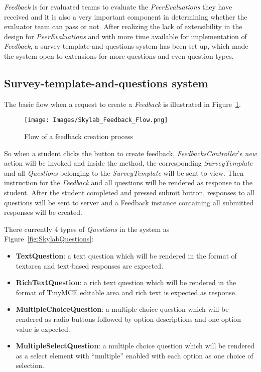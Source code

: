 \textit{Feedback} is for evaluated teams to evaluate the \textit{PeerEvaluations} they have received and it is also a very important component in determining whether the evaluator team can pass or not. After realizing the lack of extensibility in the design for \textit{PeerEvaluations} and with more time available for implementation of \textit{Feedback}, a survey-template-and-questions system has been set up, which made the system open to extensions for more questions and even question types.

\subsection{Survey-template-and-questions system}

The basic flow when a request to create a \textit{Feedback} is illustrated in Figure~\ref{fig:FeedbackFlow}.

\begin{figure}[h]
  \centering
  \texttt{[image: Images/Skylab\_Feedback\_Flow.png]}
  \caption{Flow of a feedback creation process}
  \label{fig:FeedbackFlow}
\end{figure}

So when a student clicks the button to create feedback, \textit{FeedbacksController}'s \textit{new} action will be invoked and inside the method, the corresponding \textit{SurveyTemplate} and all \textit{Questions} belonging to the \textit{SurveyTemplate} will be sent to view. Then instruction for the \textit{Feedback} and all questions will be rendered as response to the student. After the student completed and pressed submit button, responses to all questions will be sent to server and a Feedback instance containing all submitted responses will be created.

There currently 4 types of \textit{Questions} in the system as Figure~\ref{fig:SkylabQuestions}:

\begin{itemize}
  \item \textbf{TextQuestion}: a text question which will be rendered in the format of textarea and text-based responses are expected. 
  \item \textbf{RichTextQuestion}: a rich text question which will be rendered in the format of TinyMCE editable area and rich text is expected as response.
  \item \textbf{MultipleChoiceQuestion}: a multiple choice question which will be rendered as radio buttons followed by option descriptions and one option value is expected.
  \item \textbf{MultipleSelectQuestion}: a multiple choice question which will be rendered as a select element with ``multiple'' enabled with each option as one choice of selection.
\end{itemize}

